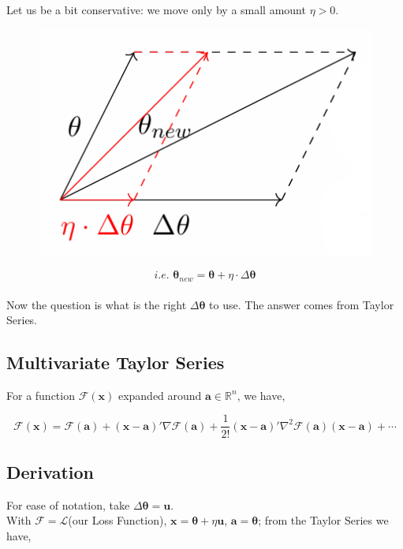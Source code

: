 \documentclass[11pt, a4paper]{article}
\begin{document}
Let us be a bit conservative: we move only by a small amount $\eta > 0$.

\begin{figure}[!htbp]
\centering
\includegraphics[scale=0.7]{image_2}
\end{figure}

$$i.e. \,\, \boldsymbol{\theta}_{new} = \boldsymbol{\theta} + \eta \cdot \Delta\boldsymbol{\theta}$$ \\[0.5em]

Now the question is what is the right $\Delta\boldsymbol{\theta}$ to use. The answer comes from Taylor Series.

\newpage

\subsection{Multivariate Taylor Series}

For a function $\mathcal{F}(\mathbf{x})$ expanded around $\mathbf{a} \in \mathbb{R}^n$, we have,

$$
\mathcal{F}(\mathbf{x}) = \mathcal{F}(\mathbf{a}) + (\mathbf{x} - \mathbf{a})' \nabla \mathcal{F}(\mathbf{a}) + \dfrac{1}{2!} (\mathbf{x} - \mathbf{a})' \nabla^2 \mathcal{F}(\mathbf{a}) (\mathbf{x} - \mathbf{a}) + \cdots
$$

\subsection{Derivation}

For ease of notation, take $\Delta \boldsymbol{\theta} = \boldsymbol{u}$. \\


With $\mathcal{F} = \mathscr{L}$(our Loss Function), $\mathbf{x} = \boldsymbol{\theta} + \eta \boldsymbol{u}$, $\mathbf{a} = \boldsymbol{\theta}$; from the Taylor Series we have,
\end{document}
